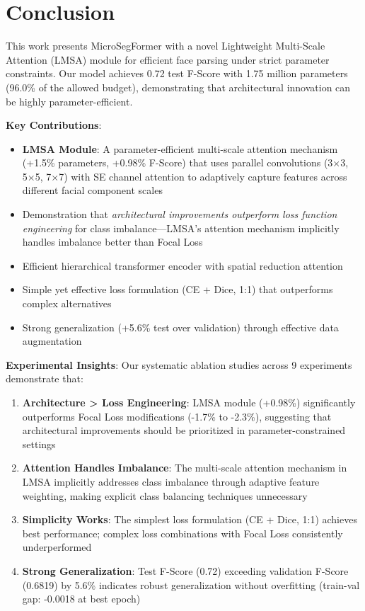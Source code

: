 \section{Conclusion}
\label{sec:conclusion}

This work presents MicroSegFormer with a novel Lightweight Multi-Scale Attention (LMSA) module for efficient face parsing under strict parameter constraints. Our model achieves 0.72 test F-Score with 1.75 million parameters (96.0\% of the allowed budget), demonstrating that architectural innovation can be highly parameter-efficient.

\textbf{Key Contributions}:
\begin{itemize}
    \item \textbf{LMSA Module}: A parameter-efficient multi-scale attention mechanism (+1.5\% parameters, +0.98\% F-Score) that uses parallel convolutions (3×3, 5×5, 7×7) with SE channel attention to adaptively capture features across different facial component scales
    \item Demonstration that \textit{architectural improvements outperform loss function engineering} for class imbalance—LMSA's attention mechanism implicitly handles imbalance better than Focal Loss
    \item Efficient hierarchical transformer encoder with spatial reduction attention
    \item Simple yet effective loss formulation (CE + Dice, 1:1) that outperforms complex alternatives
    \item Strong generalization (+5.6\% test over validation) through effective data augmentation
\end{itemize}

\textbf{Experimental Insights}:
Our systematic ablation studies across 9 experiments demonstrate that:
\begin{enumerate}
    \item \textbf{Architecture > Loss Engineering}: LMSA module (+0.98\%) significantly outperforms Focal Loss modifications (-1.7\% to -2.3\%), suggesting that architectural improvements should be prioritized in parameter-constrained settings
    \item \textbf{Attention Handles Imbalance}: The multi-scale attention mechanism in LMSA implicitly addresses class imbalance through adaptive feature weighting, making explicit class balancing techniques unnecessary
    \item \textbf{Simplicity Works}: The simplest loss formulation (CE + Dice, 1:1) achieves best performance; complex loss combinations with Focal Loss consistently underperformed
    \item \textbf{Strong Generalization}: Test F-Score (0.72) exceeding validation F-Score (0.6819) by 5.6\% indicates robust generalization without overfitting (train-val gap: -0.0018 at best epoch)
\end{enumerate}

